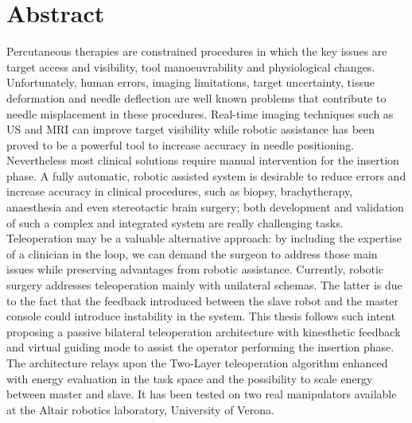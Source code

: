 \chapter{Abstract}
Percutaneous therapies are constrained procedures in which the key issues are target access and visibility, tool manoeuvrability and physiological changes.
Unfortunately, human errors, imaging limitations, target uncertainty, tissue deformation and needle deflection are well known problems that contribute to needle misplacement in these procedures.
Real-time imaging techniques such as US and MRI can improve target visibility while robotic assistance has been proved to be a powerful tool to increase accuracy in needle positioning.
Nevertheless most clinical solutions require manual intervention for the insertion phase.
A fully automatic, robotic assisted system is desirable to reduce errors and increase accuracy in clinical procedures, such as biopsy, brachytherapy, anaesthesia and even stereotactic brain surgery; both development and validation of such a complex and integrated system are really challenging tasks.\\
Teleoperation may be a valuable alternative approach: by including the expertise of a clinician in the loop, we can demand the surgeon to address those main issues while preserving advantages from robotic assistance. Currently, robotic surgery addresses teleoperation mainly with unilateral schemas. The latter is due to the fact that the feedback introduced between the slave robot and the master console could introduce instability in the system.
This thesis follows such intent proposing a passive bilateral teleoperation architecture with kinesthetic feedback and virtual guiding mode to assist the operator performing the insertion phase.
The architecture relays upon the Two-Layer teleoperation algorithm enhanced with energy evaluation in the task space and the possibility to scale energy between master and slave. It has been tested on two real manipulators available at the Altair robotics laboratory, University of Verona. 


\clearpage
\thispagestyle{empty}